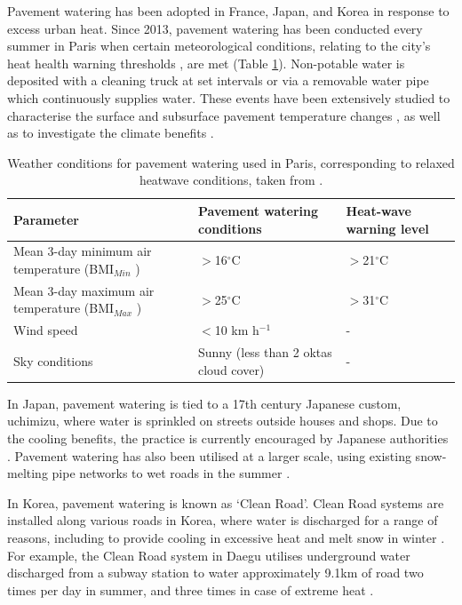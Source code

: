 \documentclass[final,3p,times,authoryear]{elsarticle}
\begin{document}
Pavement watering has been adopted in France, Japan, and Korea in response to excess
urban heat.
Since 2013, pavement watering has been conducted every summer in Paris when certain
meteorological conditions, relating to the city's heat health warning thresholds \citep{Pascal2006}, are met (Table \ref{table:7.1}). Non-potable water is deposited with a cleaning truck at set intervals or via a removable water pipe which continuously supplies water. These events have been extensively studied to characterise the surface and subsurface pavement temperature changes \cite{Hendel2015,Hendel2015a,Hendel2015b,Hendel2014}, as well as to investigate the climate benefits \citep{Hendel2016,Parison2020}.


\begin{table}[!ht]\caption{Weather conditions for pavement watering used in Paris, corresponding to relaxed heatwave conditions, taken from \cite{Hendel2015a}.}
    \centering
    \begin{tabular}{|p{5.0cm}|p{5.0cm}|p{5.0cm}|}
    \hline
        \textbf{Parameter} & \textbf{Pavement watering conditions} & \textbf{Heat-wave warning level}\\ \hline
		Mean 3-day minimum air temperature (BMI$_{Min}$ )&$>$16$^{\circ}$C & $>$21$^{\circ}$C\\ \hline
		Mean 3-day maximum air temperature (BMI$_{Max}$ )&$>$25$^{\circ}$C & $>$31$^{\circ}$C\\ \hline
		Wind speed &$<$10 km h$^{-1}$ &-\\ \hline
		Sky conditions&Sunny (less than 2 oktas cloud cover) &-\\ \hline  
    \end{tabular} \label{table:7.1}
\end{table}


In Japan, pavement watering is tied to a 17th century Japanese custom, uchimizu, where water is sprinkled on streets outside houses and shops. Due to the cooling benefits, the practice is currently encouraged by Japanese authorities \citep{Solcerova2018}. Pavement watering has also been utilised at a larger scale, using existing snow-melting pipe networks to wet roads in the summer \citep{Kinouchi1997,Himeno2010}.

In Korea, pavement watering is known as `Clean Road'. Clean Road systems are installed along various roads in Korea, where water is discharged for a range of reasons, including to provide cooling in excessive heat and melt snow in winter \citep{Na2021}. For example, the Clean Road system in Daegu utilises underground water discharged from a subway station to water approximately 9.1km of road two times per day in summer, and three times in case of extreme heat \citep{Kim2015,Na2021}.
\end{document}
